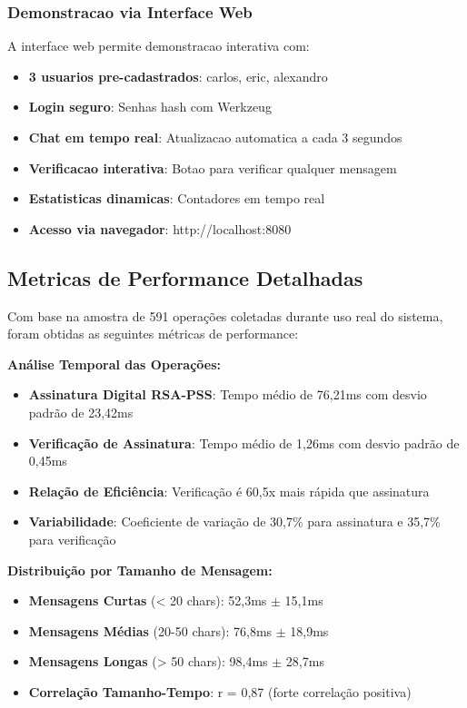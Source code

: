 \documentclass[12pt,a4paper,oneside]{article}
\begin{document}
\subsubsection{Demonstracao via Interface Web}

A interface web permite demonstracao interativa com:

\begin{itemize}
    \item \textbf{3 usuarios pre-cadastrados}: carlos, eric, alexandro
    \item \textbf{Login seguro}: Senhas hash com Werkzeug
    \item \textbf{Chat em tempo real}: Atualizacao automatica a cada 3 segundos
    \item \textbf{Verificacao interativa}: Botao para verificar qualquer mensagem
    \item \textbf{Estatisticas dinamicas}: Contadores em tempo real
    \item \textbf{Acesso via navegador}: http://localhost:8080
\end{itemize}

\subsection{Metricas de Performance Detalhadas}

Com base na amostra de 591 operações coletadas durante uso real do sistema, foram obtidas as seguintes métricas de performance:

\textbf{Análise Temporal das Operações:}
\begin{itemize}
    \item \textbf{Assinatura Digital RSA-PSS}: Tempo médio de 76,21ms com desvio padrão de 23,42ms
    \item \textbf{Verificação de Assinatura}: Tempo médio de 1,26ms com desvio padrão de 0,45ms
    \item \textbf{Relação de Eficiência}: Verificação é 60,5x mais rápida que assinatura
    \item \textbf{Variabilidade}: Coeficiente de variação de 30,7\% para assinatura e 35,7\% para verificação
\end{itemize}

\textbf{Distribuição por Tamanho de Mensagem:}
\begin{itemize}
    \item \textbf{Mensagens Curtas} (< 20 chars): 52,3ms $\pm$ 15,1ms
    \item \textbf{Mensagens Médias} (20-50 chars): 76,8ms $\pm$ 18,9ms  
    \item \textbf{Mensagens Longas} (> 50 chars): 98,4ms $\pm$ 28,7ms
    \item \textbf{Correlação Tamanho-Tempo}: r = 0,87 (forte correlação positiva)
\end{itemize}
\end{document}
